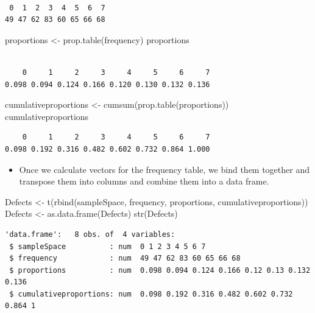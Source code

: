 \documentclass[
  letterpaper,
  DIV=11,
  numbers=noendperiod]{scrreprt}
\newenvironment{Shaded}{\begin{snugshade}}{\end{snugshade}}
\newcommand{\FunctionTok}[1]{\textcolor[rgb]{0.28,0.35,0.67}{#1}}
\newcommand{\NormalTok}[1]{\textcolor[rgb]{0.00,0.23,0.31}{#1}}
\newcommand{\OtherTok}[1]{\textcolor[rgb]{0.00,0.23,0.31}{#1}}
\providecommand{\tightlist}{%
  \setlength{\itemsep}{0pt}\setlength{\parskip}{0pt}}\usepackage{longtable,booktabs,array}
\begin{document}
\begin{verbatim}

 0  1  2  3  4  5  6  7 
49 47 62 83 60 65 66 68 
\end{verbatim}

\begin{Shaded}
\begin{Highlighting}[]
\NormalTok{proportions }\OtherTok{\textless{}{-}} \FunctionTok{prop.table}\NormalTok{(frequency)}
\NormalTok{proportions}
\end{Highlighting}
\end{Shaded}

\begin{verbatim}

    0     1     2     3     4     5     6     7 
0.098 0.094 0.124 0.166 0.120 0.130 0.132 0.136 
\end{verbatim}

\begin{Shaded}
\begin{Highlighting}[]
\NormalTok{cumulativeproportions }\OtherTok{\textless{}{-}} \FunctionTok{cumsum}\NormalTok{(}\FunctionTok{prop.table}\NormalTok{(proportions))}
\NormalTok{cumulativeproportions}
\end{Highlighting}
\end{Shaded}

\begin{verbatim}
    0     1     2     3     4     5     6     7 
0.098 0.192 0.316 0.482 0.602 0.732 0.864 1.000 
\end{verbatim}

\begin{itemize}
\tightlist
\item
  Once we calculate vectors for the frequency table, we bind them
  together and transpose them into columns and combine them into a data
  frame.
\end{itemize}

\begin{Shaded}
\begin{Highlighting}[]
\NormalTok{Defects }\OtherTok{\textless{}{-}} \FunctionTok{t}\NormalTok{(}\FunctionTok{rbind}\NormalTok{(sampleSpace, frequency, proportions, cumulativeproportions))}
\NormalTok{Defects }\OtherTok{\textless{}{-}} \FunctionTok{as.data.frame}\NormalTok{(Defects)}
\FunctionTok{str}\NormalTok{(Defects)}
\end{Highlighting}
\end{Shaded}

\begin{verbatim}
'data.frame':   8 obs. of  4 variables:
 $ sampleSpace          : num  0 1 2 3 4 5 6 7
 $ frequency            : num  49 47 62 83 60 65 66 68
 $ proportions          : num  0.098 0.094 0.124 0.166 0.12 0.13 0.132 0.136
 $ cumulativeproportions: num  0.098 0.192 0.316 0.482 0.602 0.732 0.864 1
\end{verbatim}
\end{document}
